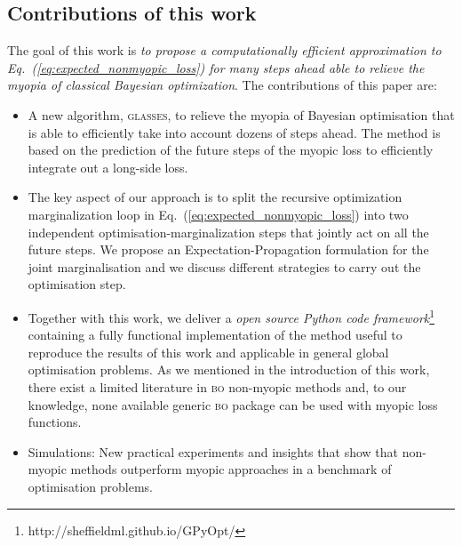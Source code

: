 \documentclass[twoside]{article}
\newcommand{\acr}[1]{\textsc{#1}\xspace}
\newcommand{\us}{\acr{glasses}}
\newcommand{\bo}{\acr{bo}}
\begin{document}
\subsection{Contributions of this work}

The goal of this work is \emph{to propose a computationally efficient approximation to Eq.~(\ref{eq:expected_nonmyopic_loss}) for many steps ahead able to relieve the myopia of classical Bayesian optimization}. The contributions of this paper are:
\begin{itemize}
\item A new algorithm, \us, to relieve the myopia of Bayesian optimisation that is able to efficiently take into account dozens of steps ahead. The method is based on the prediction of the future steps of the myopic loss to efficiently integrate out a long-side loss. 
\item The key aspect of our approach is to split the recursive optimization marginalization loop in Eq.~(\ref{eq:expected_nonmyopic_loss}) into two independent optimisation-marginalization steps that jointly act on all the future steps. We propose an Expectation-Propagation formulation for the joint marginalisation and we discuss different strategies to carry out the optimisation step.
\item Together with this work, we deliver a \emph{open source Python code framework}\footnote{http://sheffieldml.github.io/GPyOpt/} containing a fully functional  implementation of the method useful to reproduce the results of this work and applicable in general global optimisation problems. As we mentioned in the introduction of this work, there exist a limited literature in \bo non-myopic methods and, to our knowledge, none available generic \bo package can be used with myopic loss functions. 
\item Simulations: New practical experiments and insights that show that non-myopic methods outperform myopic approaches in a benchmark of optimisation problems. 
\end{itemize}
\end{document}
